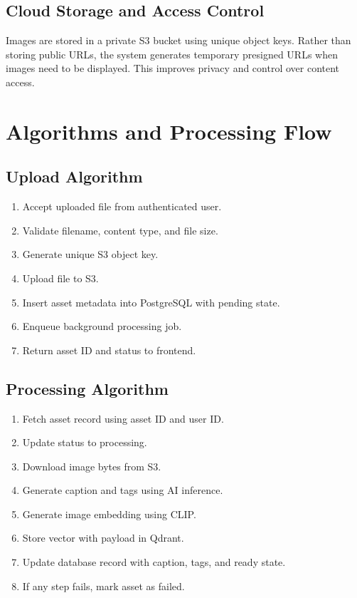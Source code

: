 \documentclass[12pt,a4paper]{report}
\begin{document}
\section{Cloud Storage and Access Control}
Images are stored in a private S3 bucket using unique object keys. Rather than storing public URLs, the system generates temporary presigned URLs when images need to be displayed. This improves privacy and control over content access.

\chapter{Algorithms and Processing Flow}
\section{Upload Algorithm}
\begin{enumerate}[leftmargin=*]
    \item Accept uploaded file from authenticated user.
    \item Validate filename, content type, and file size.
    \item Generate unique S3 object key.
    \item Upload file to S3.
    \item Insert asset metadata into PostgreSQL with pending state.
    \item Enqueue background processing job.
    \item Return asset ID and status to frontend.
\end{enumerate}

\section{Processing Algorithm}
\begin{enumerate}[leftmargin=*]
    \item Fetch asset record using asset ID and user ID.
    \item Update status to processing.
    \item Download image bytes from S3.
    \item Generate caption and tags using AI inference.
    \item Generate image embedding using CLIP.
    \item Store vector with payload in Qdrant.
    \item Update database record with caption, tags, and ready state.
    \item If any step fails, mark asset as failed.
\end{enumerate}
\end{document}
